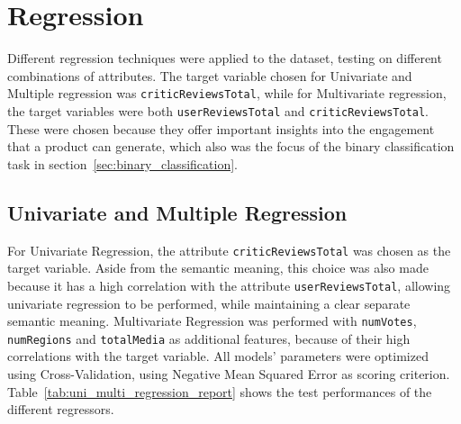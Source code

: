 \chapter{Regression}
\label{ch:capitolo4}
Different regression techniques were applied to the dataset, testing
on different combinations of attributes. The target variable chosen for
Univariate and Multiple regression was \texttt{criticReviewsTotal}, while
for Multivariate regression, the target variables were both
\texttt{userReviewsTotal} and \texttt{criticReviewsTotal}.
These were chosen because they offer important insights into the engagement
that a product can generate, which also was the focus of the binary
classification task in section~\ref{sec:binary_classification}.


\section{Univariate and Multiple Regression}
For Univariate Regression, the attribute
\texttt{criticReviewsTotal} was chosen
as the target variable. Aside from the semantic meaning, this choice was also made
because it has a high correlation
with the attribute \texttt{userReviewsTotal}, allowing univariate regression
to be performed, while maintaining a clear separate semantic meaning.
Multivariate Regression was performed with \texttt{numVotes}, \texttt{numRegions} and
\texttt{totalMedia} as additional features, because of their high correlations with the target variable.
All models' parameters
were optimized using Cross-Validation, using Negative Mean Squared Error as scoring criterion.
Table~\ref{tab:uni_multi_regression_report} shows the test performances of the different regressors.
